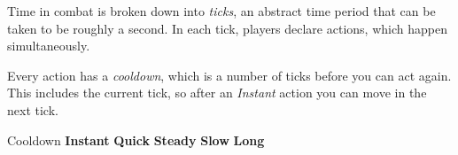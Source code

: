 
Time in combat is broken down into \emph{ticks}, an abstract time period that can be taken to be roughly a second. In each tick, players declare actions, which happen simultaneously.

Every action has a \emph{cooldown}, which is a number of ticks before you can act again. This includes the current tick, so after an \emph{Instant} action you can move in the next tick.

\begin{abstractsection}{Cooldown}
  \textbf{Instant}  \quad
  \textbf{Quick}    \quad
  \textbf{Steady}   \quad
  \textbf{Slow}     \quad
  \textbf{Long}    
\end{abstractsection}
